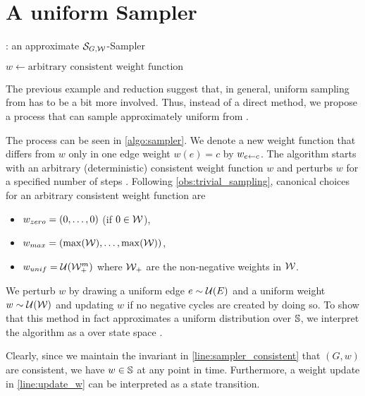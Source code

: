 \section{A uniform Sampler}
\begin{algorithm}[!t]
  \caption{
    \algsl: an approximate $\mathcal{S}_{G, \mathcal W}$-Sampler~\cite{RNEW} 
  }
  \label{algo:sampler}


  \BlankLine
  $w \gets \text{arbitrary consistent weight function}$\;
  \;
\end{algorithm}

The previous example and reduction suggest that, in general, uniform sampling from \states has to be a bit more involved.
Thus, instead of a direct method, we propose a process that can sample approximately uniform from \states.

The process can be seen in \cref{algo:sampler}.
We denote a new weight function that differs from $w$ only in one edge weight $w(e) = c$ by $w_{e \gets c}$.
The algorithm starts with an arbitrary (deterministic) consistent weight function $w$ and perturbs $w$ for a specified number of steps \steps.
Following \cref{obs:trivial_sampling}, canonical choices for an arbitrary consistent weight function are \begin{itemize}
  \item $w_{zero} = (0, \ldots, 0)$ (if $0 \in \mathcal W$),
  \item $w_{max} = (\max(\mathcal W), \ldots, \max(\mathcal W))$,
  \item $w_{unif} = \mathcal U(\mathcal W_+^m)$ where $\mathcal W_+$ are the non-negative weights in $\mathcal W$.
\end{itemize}

\noindent We perturb $w$ by drawing a uniform edge $e \sim \mathcal U(E)$ and a uniform weight $w \sim \mathcal U(\mathcal W)$ and updating $w$ if no negative cycles are created by doing so.
To show that this method in fact approximates a uniform distribution over $\mathbb S$, we interpret the algorithm as a \markov over state space \cstates.

Clearly, since we maintain the invariant in \cref{line:sampler_consistent} that $(G, w)$ are consistent, we have $w \in \mathbb S$ at any point in time.
Furthermore, a weight update in \cref{line:update_w} can be interpreted as a state transition.

